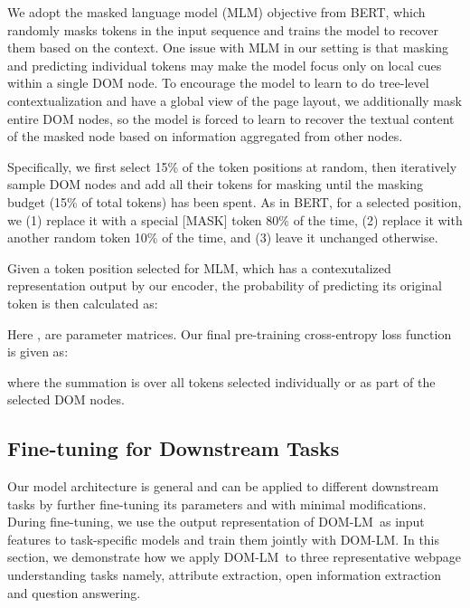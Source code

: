 \documentclass[sigconf, nonacm]{acmart}
\newcommand{\ours}[0]{DOM-LM}
\newcommand{\nop}[1]{}
\begin{document}
We adopt the masked language model (MLM) objective from BERT, which randomly masks tokens in the input sequence and trains the model to recover them based on the context. One issue with MLM in our setting is that masking and predicting individual tokens may make the model focus only on local cues within a single DOM node. To encourage the model to learn to do tree-level contextualization and have a global view of the page layout, we additionally mask entire DOM nodes, so the model is forced to learn to recover the textual content of the masked node based on information aggregated from other nodes.

Specifically, we first select 15\% of the token positions at random, then iteratively sample DOM nodes and add all their tokens for masking until the masking budget (15\% of total tokens) has been spent. As in BERT, for a selected position, we (1) replace it with a special [MASK] token 80\% of the time, (2) replace it with another random token 10\% of the time, and (3) leave it unchanged otherwise.

Given a token position selected for MLM, which has a contexutalized representation  output by our encoder, the probability  of predicting its original token  is then calculated as: 
\nop{LINEAR is not a formal term in a mathematical definition. Let's use something like  to replace it.}
Here ,  are parameter matrices. Our final pre-training cross-entropy loss function is given as:
 
 {where the summation is over all tokens selected individually or as part of the selected DOM nodes.}

\subsection{Fine-tuning for Downstream Tasks}

Our model architecture is general and can be applied to different downstream tasks by further fine-tuning its parameters and with minimal modifications. During fine-tuning, we use the output representation of \ours\ as input features to task-specific models and train them jointly with \ours. In this section, we demonstrate how we apply \ours\ to three representative webpage understanding tasks namely, attribute extraction, open information extraction and question answering. \nop{Say a bit about what fine-tuning means: we are going to update the pre-trained model parameters for each downstream task separately right? (IOW, weights aren't frozen, correct?)}
\end{document}
